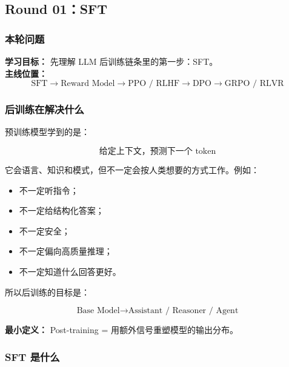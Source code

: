 
\subsection{Round 01：SFT}

\subsubsection{本轮问题}

\begin{conceptbox}
\textbf{学习目标：} 先理解 LLM 后训练链条里的第一步：SFT。\\
\textbf{主线位置：}
\[
\text{SFT} \to \text{Reward Model} \to \text{PPO / RLHF} \to \text{DPO} \to \text{GRPO / RLVR}
\]
\end{conceptbox}

\subsubsection{后训练在解决什么}

预训练模型学到的是：

\[
\text{给定上下文，预测下一个 token}
\]

它会语言、知识和模式，但不一定会按人类想要的方式工作。例如：

\begin{itemize}[leftmargin=1.5em]
  \item 不一定听指令；
  \item 不一定给结构化答案；
  \item 不一定安全；
  \item 不一定偏向高质量推理；
  \item 不一定知道什么回答更好。
\end{itemize}

所以后训练的目标是：

\[
\text{Base Model} \to \text{Assistant / Reasoner / Agent}
\]

\begin{summarybox}
\textbf{最小定义：} Post-training = 用额外信号重塑模型的输出分布。
\end{summarybox}

\subsubsection{SFT 是什么}


